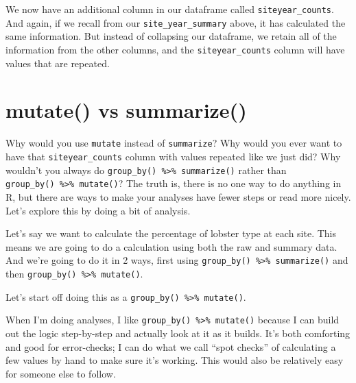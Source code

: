 \documentclass[]{book}
\newenvironment{Shaded}{\begin{snugshade}}{\end{snugshade}}
\newcommand{\DataTypeTok}[1]{\textcolor[rgb]{0.13,0.29,0.53}{#1}}
\newcommand{\DecValTok}[1]{\textcolor[rgb]{0.00,0.00,0.81}{#1}}
\newcommand{\KeywordTok}[1]{\textcolor[rgb]{0.13,0.29,0.53}{\textbf{#1}}}
\newcommand{\NormalTok}[1]{#1}
\newcommand{\OperatorTok}[1]{\textcolor[rgb]{0.81,0.36,0.00}{\textbf{#1}}}
\newcommand{\StringTok}[1]{\textcolor[rgb]{0.31,0.60,0.02}{#1}}
\begin{document}
We now have an additional column in our dataframe called \texttt{siteyear\_counts}. And again, if we recall from our \texttt{site\_year\_summary} above, it has calculated the same information. But instead of collapsing our dataframe, we retain all of the information from the other columns, and the \texttt{siteyear\_counts} column will have values that are repeated.

\hypertarget{mutate-vs-summarize}{%
\section{mutate() vs summarize()}\label{mutate-vs-summarize}}

Why would you use \texttt{mutate} instead of \texttt{summarize}? Why would you ever want to have that \texttt{siteyear\_counts} column with values repeated like we just did? Why wouldn't you always do \texttt{group\_by()\ \%\textgreater{}\%\ summarize()} rather than \texttt{group\_by()\ \%\textgreater{}\%\ mutate()}? The truth is, there is no one way to do anything in R, but there are ways to make your analyses have fewer steps or read more nicely. Let's explore this by doing a bit of analysis.

Let's say we want to calculate the percentage of lobster type at each site. This means we are going to do a calculation using both the raw and summary data. And we're going to do it in 2 ways, first using \texttt{group\_by()\ \%\textgreater{}\%\ summarize()} and then \texttt{group\_by()\ \%\textgreater{}\%\ mutate()}.

Let's start off doing this as a \texttt{group\_by()\ \%\textgreater{}\%\ mutate()}.

\begin{Shaded}
\end{Shaded}

When I'm doing analyses, I like \texttt{group\_by()\ \%\textgreater{}\%\ mutate()} because I can build out the logic step-by-step and actually look at it as it builds. It's both comforting and good for error-checks; I can do what we call ``spot checks'' of calculating a few values by hand to make sure it's working. This would also be relatively easy for someone else to follow.
\end{document}
